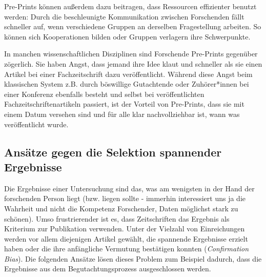 \documentclass[
  letterpaper,
  DIV=11,
  numbers=noendperiod]{scrreprt}
\begin{document}
Pre-Prints können außerdem dazu beitragen, dass Ressourcen effizienter
benutzt werden: Durch die beschleunigte Kommunikation zwischen
Forschenden fällt schneller auf, wenn verschiedene Gruppen an derselben
Fragestellung arbeiten. So können sich Kooperationen bilden oder Gruppen
verlagern ihre Schwerpunkte.

\begin{tcolorbox}[enhanced jigsaw, title=\textcolor{quarto-callout-note-color}{\faInfo}\hspace{0.5em}{Unberechtigte Sorge vor Ideenklau}, colbacktitle=quarto-callout-note-color!10!white, rightrule=.15mm, titlerule=0mm, left=2mm, bottomrule=.15mm, arc=.35mm, leftrule=.75mm, toprule=.15mm, opacityback=0, breakable, bottomtitle=1mm, colframe=quarto-callout-note-color-frame, toptitle=1mm, opacitybacktitle=0.6, coltitle=black, colback=white]

In manchen wissenschaftlichen Disziplinen sind Forschende Pre-Prints
gegenüber zögerlich. Sie haben Angst, dass jemand ihre Idee klaut und
schneller als sie einen Artikel bei einer Fachzeitschrift dazu
veröffentlicht. Während diese Angst beim klassischen System z.B. durch
böswillige Gutachtende oder Zuhörer*innen bei einer Konferenz ebenfalls
besteht und selbst bei veröffentlichten Fachzeitschriftenartikeln
passiert, ist der Vorteil von Pre-Prints, dass sie mit einem Datum
versehen sind und für alle klar nachvollziehbar ist, wann was
veröffentlicht wurde.

\end{tcolorbox}

\subsection{Ansätze gegen die Selektion spannender
Ergebnisse}\label{ansuxe4tze-gegen-die-selektion-spannender-ergebnisse}

Die Ergebnisse einer Untersuchung sind das, was am wenigsten in der Hand
der forschenden Person liegt (bzw. liegen sollte - immerhin interessiert
uns ja die Wahrheit und nicht die Kompetenz Forschender, Daten möglichst
stark zu schönen). Umso frustrierender ist es, dass Zeitschriften das
Ergebnis als Kriterium zur Publikation verwenden. Unter der Vielzahl von
Einreichungen werden vor allem diejenigen Artikel gewählt, die spannende
Ergebnisse erzielt haben oder die ihre anfängliche Vermutung bestätigen
konnten (\emph{Confirmation Bias}). Die folgenden Ansätze lösen dieses
Problem zum Beispiel dadurch, dass die Ergebnisse aus dem
Begutachtungsprozess ausgeschlossen werden.
\end{document}
